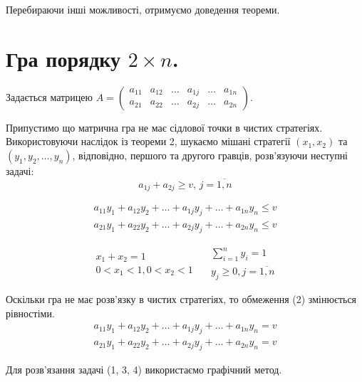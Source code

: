 \documentclass[12pt,a4paper]{report}
\begin{document}
Перебираючи інші можливості, отримуємо доведення теореми.

\clearpage

\chapter{Гра порядку $2 \times n$.}
Задається матрицею $A=\left ( \begin{array}{cccccc}
a_{11}&a_{12}&\dots&a_{1j}&\dots&a_{1n}\\
a_{21}&a_{22}&\dots&a_{2j}&\dots&a_{2n}
\end{array}\right)$.

Припустимо що матрична гра не має сідлової точки в чистих стратегіях. Використовуючи наслідок із теореми 2, шукаємо мішані стратегії $(x_1, x_2)$ та $(y_1,y_2,\dots,y_n)$, відповідно, першого та другого гравців, розв'язуючи неступні задачі:
\begin{equation}
a_{1j}+a_{2j} \ge v, \, j=\overline{1,n}
\end{equation}

\begin{equation}
\begin{array}{l}
a_{11}y_1+a_{12}y_2+\dots+a_{1j}y_j+\dots+a_{1n}y_n \le v\\
a_{21}y_1+a_{22}y_2+\dots+a_{2j}y_j+\dots+a_{2n}y_n \le v
\end{array}
\end{equation}

\begin{equation}
\begin{array}{c}
x_1+x_2=1\\
0<x_1<1, 0<x_2<1
\end{array}
\quad
\begin{array}{c}
\sum_{i=1}^n y_i=1\\
y_j \ge 0, j=\overline{1,n}
\end{array}
\end{equation}

Оскільки гра не має розв'язку в чистих стратегіях, то обмеження (2) змінюється рівностіми.
\begin{equation}
\begin{array}{l}
a_{11}y_1+a_{12}y_2+\dots+a_{1j}y_j+\dots+a_{1n}y_n = v\\
a_{21}y_1+a_{22}y_2+\dots+a_{2j}y_j+\dots+a_{2n}y_n = v
\end{array}
\end{equation}

Для розв'язання задачі (1, 3, 4) використаємо графічний метод.
\end{document}
